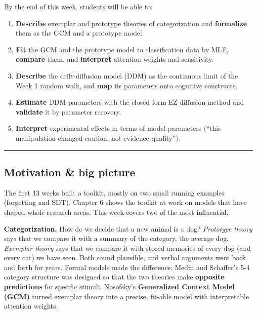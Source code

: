 By the end of this week, students will be able to:

\begin{enumerate}
\def\labelenumi{\arabic{enumi}.}
\tightlist
\item
  \textbf{Describe} exemplar and prototype theories of categorization
  and \textbf{formalize} them as the GCM and a prototype model.
\item
  \textbf{Fit} the GCM and the prototype model to classification data by
  MLE, \textbf{compare} them, and \textbf{interpret} attention weights
  and sensitivity.
\item
  \textbf{Describe} the drift-diffusion model (DDM) as the continuous
  limit of the Week 1 random walk, and \textbf{map} its parameters onto
  cognitive constructs.
\item
  \textbf{Estimate} DDM parameters with the closed-form EZ-diffusion
  method and \textbf{validate} it by parameter recovery.
\item
  \textbf{Interpret} experimental effects in terms of model parameters
  (``this manipulation changed caution, not evidence quality'').
\end{enumerate}

\begin{center}\rule{0.5\linewidth}{0.5pt}\end{center}

\subsection{Motivation \& big picture}

The first 13 weeks built a toolkit, mostly on two small running examples
(forgetting and SDT). Chapter 6 shows the toolkit at work on models that
have shaped whole research areas. This week covers two of the most
influential.

\textbf{Categorization.} How do we decide that a new animal is a dog?
\emph{Prototype theory} says that we compare it with a summary of the
category, the average dog. \emph{Exemplar theory} says that we compare
it with stored memories of every dog (and every cat) we have seen. Both
sound plausible, and verbal arguments went back and forth for years.
Formal models made the difference: Medin and Schaffer's 5-4 category
structure was designed so that the two theories make \textbf{opposite
predictions} for specific stimuli. Nosofsky's \textbf{Generalized
Context Model (GCM)} turned exemplar theory into a precise, fit-able
model with interpretable attention weights.

